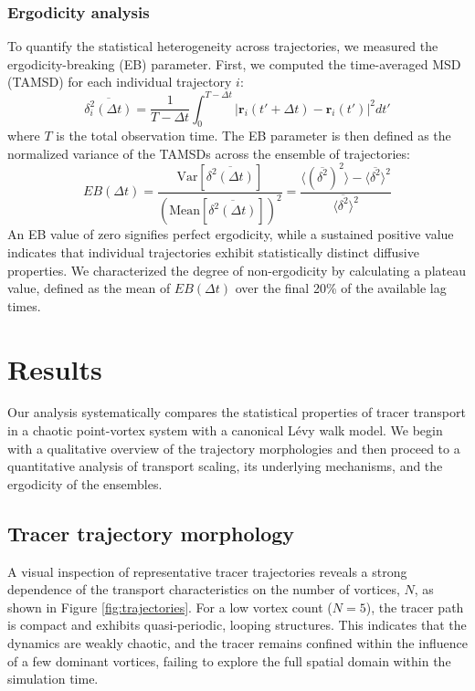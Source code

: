 \documentclass[]{article}
\begin{document}
\subsubsection{Ergodicity analysis}
To quantify the statistical heterogeneity across trajectories, we measured the ergodicity-breaking (EB) parameter. First, we computed the time-averaged MSD (TAMSD) for each individual trajectory $i$:
\begin{equation}
\overline{\delta_i^2(\Delta t)} = \frac{1}{T-\Delta t} \int_0^{T-\Delta t} |\mathbf{r}_i(t'+\Delta t) - \mathbf{r}_i(t')|^2 dt'
\end{equation}
where $T$ is the total observation time. The EB parameter is then defined as the normalized variance of the TAMSDs across the ensemble of trajectories:
\begin{equation}
EB(\Delta t) = \frac{\text{Var}[\overline{\delta^2(\Delta t)}]}{(\text{Mean}[\overline{\delta^2(\Delta t)}])^2} = \frac{\langle (\overline{\delta^2})^2 \rangle - \langle \overline{\delta^2} \rangle^2}{\langle \overline{\delta^2} \rangle^2}
\end{equation}
An EB value of zero signifies perfect ergodicity, while a sustained positive value indicates that individual trajectories exhibit statistically distinct diffusive properties. We characterized the degree of non-ergodicity by calculating a plateau value, defined as the mean of $EB(\Delta t)$ over the final 20\% of the available lag times.

\section{Results}
\label{sec:results}
Our analysis systematically compares the statistical properties of tracer transport in a chaotic point-vortex system with a canonical Lévy walk model. We begin with a qualitative overview of the trajectory morphologies and then proceed to a quantitative analysis of transport scaling, its underlying mechanisms, and the ergodicity of the ensembles.

\subsection{Tracer trajectory morphology}

A visual inspection of representative tracer trajectories reveals a strong dependence of the transport characteristics on the number of vortices, $N$, as shown in Figure \ref{fig:trajectories}. For a low vortex count ($N=5$), the tracer path is compact and exhibits quasi-periodic, looping structures. This indicates that the dynamics are weakly chaotic, and the tracer remains confined within the influence of a few dominant vortices, failing to explore the full spatial domain within the simulation time.
\end{document}
